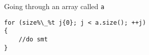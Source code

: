 \noindent Going through an array called \texttt{a}\\
\begin{minipage}{.5\textwidth}
\end{minipage}\hspace{0.72cm}
\begin{minipage}{.6\textwidth}
\vspace{0.1cm}
\begin{lstlisting}[frame=tlrb,numbers=none,mathescape=true,escapechar=\%,columns=flexible]
for (size%\_%t j{0}; j < a.size(); ++j)
{
    //do smt
}
\end{lstlisting}
\end{minipage}


    





